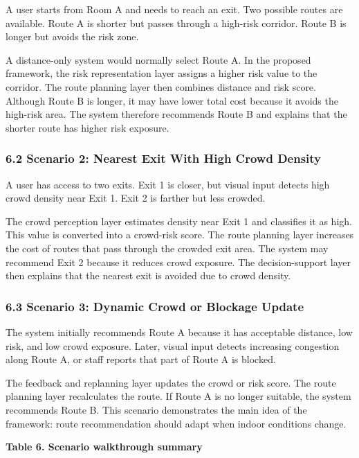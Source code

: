 \documentclass[
]{article}
\begin{document}
A user starts from Room A and needs to reach an exit. Two possible
routes are available. Route A is shorter but passes through a high-risk
corridor. Route B is longer but avoids the risk zone.

A distance-only system would normally select Route A. In the proposed
framework, the risk representation layer assigns a higher risk value to
the corridor. The route planning layer then combines distance and risk
score. Although Route B is longer, it may have lower total cost because
it avoids the high-risk area. The system therefore recommends Route B
and explains that the shorter route has higher risk exposure.

\subsubsection{6.2 Scenario 2: Nearest Exit With High Crowd
Density}\label{scenario-2-nearest-exit-with-high-crowd-density}

A user has access to two exits. Exit 1 is closer, but visual input
detects high crowd density near Exit 1. Exit 2 is farther but less
crowded.

The crowd perception layer estimates density near Exit 1 and classifies
it as high. This value is converted into a crowd-risk score. The route
planning layer increases the cost of routes that pass through the
crowded exit area. The system may recommend Exit 2 because it reduces
crowd exposure. The decision-support layer then explains that the
nearest exit is avoided due to crowd density.

\subsubsection{6.3 Scenario 3: Dynamic Crowd or Blockage
Update}\label{scenario-3-dynamic-crowd-or-blockage-update}

The system initially recommends Route A because it has acceptable
distance, low risk, and low crowd exposure. Later, visual input detects
increasing congestion along Route A, or staff reports that part of Route
A is blocked.

The feedback and replanning layer updates the crowd or risk score. The
route planning layer recalculates the route. If Route A is no longer
suitable, the system recommends Route B. This scenario demonstrates the
main idea of the framework: route recommendation should adapt when
indoor conditions change.

\textbf{Table 6. Scenario walkthrough summary}
\end{document}
